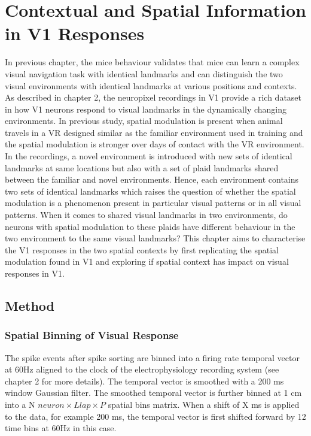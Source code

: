 \chapter{Contextual and Spatial Information in V1 Responses}
\label{chapterlabel4}
In previous chapter, the mice behaviour validates that mice can learn a complex visual navigation task with identical landmarks and can distinguish the two visual environments with identical landmarks at various positions and contexts. As described in chapter 2, the neuropixel recordings in V1 provide a rich dataset in how V1 neurons respond to visual landmarks in the dynamically changing environments. In previous study, spatial modulation is present when animal travels in a VR designed similar as the familiar environment used in training and the spatial modulation is stronger over days of contact with the VR environment. In the recordings, a novel environment is introduced with new sets of identical landmarks at same locations but also with a set of plaid landmarks shared between the familiar and novel environments. Hence, each environment contains two sets of identical landmarks which raises the question of whether the spatial modulation is a phenomenon present in particular visual patterns or in all visual patterns. When it comes to shared visual landmarks in two environments, do neurons with spatial modulation to these plaids have different behaviour in the two environment to the same visual landmarks? This chapter aims to characterise the V1 responses in the two spatial contexts by first replicating the spatial modulation found in V1 and exploring if spatial context has impact on visual responses in V1.

\section{Method}
\subsection{Spatial Binning of Visual Response}
The spike events after spike sorting are binned into a firing rate temporal vector at 60Hz aligned to the clock of the electrophysiology recording system (see chapter 2 for more details). The temporal vector is smoothed with a 200 ms window Gaussian filter. The smoothed temporal vector is further binned at 1 cm into a N \(neuron \times L lap \times P\) spatial bins matrix. When a shift of X ms is applied to the data, for example 200 ms, the temporal vector is first shifted forward by 12 time bins at 60Hz in this case. 

